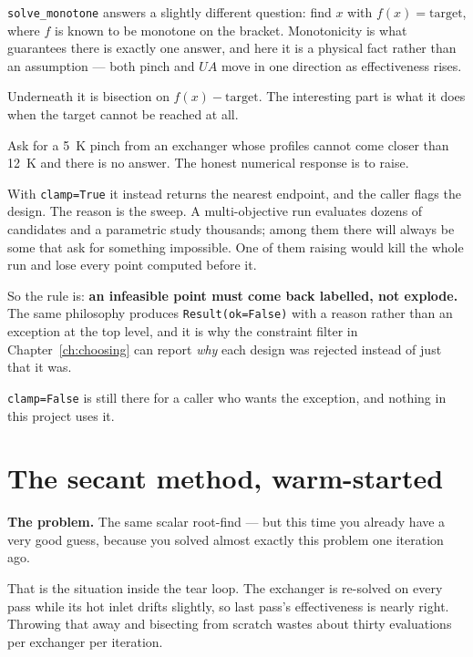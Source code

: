 \documentclass[11pt,a4paper]{report}
\newcommand{\code}[1]{\texttt{\small #1}}
\begin{document}
\code{solve\_monotone} answers a slightly different question: find $x$ with
$f(x) = \text{target}$, where $f$ is known to be monotone on the bracket.
Monotonicity is what guarantees there is exactly one answer, and here it is
a physical fact rather than an assumption --- both pinch and $UA$ move in
one direction as effectiveness rises.

Underneath it is bisection on $f(x) - \text{target}$. The interesting part
is what it does when the target cannot be reached at all.


\begin{choicebox}[title={Implementation: clamping is an engineering decision, not a numerical one}]
Ask for a \SI{5}{\kelvin} pinch from an exchanger whose profiles cannot
come closer than \SI{12}{\kelvin} and there is no answer. The honest
numerical response is to raise.

With \code{clamp=True} it instead returns the nearest endpoint, and the
caller flags the design. The reason is the sweep. A multi-objective run
evaluates dozens of candidates and a parametric study thousands; among
them there will always be some that ask for something impossible. One of
them raising would kill the whole run and lose every point computed before
it.

So the rule is: \textbf{an infeasible point must come back labelled, not
explode.} The same philosophy produces \code{Result(ok=False)} with a
reason rather than an exception at the top level, and it is why the
constraint filter in Chapter~\ref{ch:choosing} can report \emph{why} each
design was rejected instead of just that it was.

\code{clamp=False} is still there for a caller who wants the exception,
and nothing in this project uses it.
\end{choicebox}

\section{The secant method, warm-started}

\textbf{The problem.} The same scalar root-find --- but this time you
already have a very good guess, because you solved almost exactly this
problem one iteration ago.

That is the situation inside the tear loop. The exchanger is re-solved on
every pass while its hot inlet drifts slightly, so last pass's
effectiveness is nearly right. Throwing that away and bisecting from
scratch wastes about thirty evaluations per exchanger per iteration.
\end{document}
